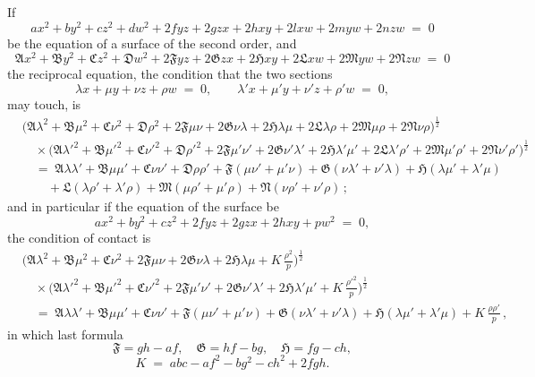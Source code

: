 \documentclass[11pt]{article}
\begin{document}
If
\[
a x^{2} + b y^{2} + c z^{2} + d w^{2} + 2 f y z + 2 g z x + 2 h x y + 2 l x w + 2 m y w + 2 n z w \;=\; 0
\]
be the equation of a surface of the second order, and
\[
\mathfrak{A} x^{2} + \mathfrak{B} y^{2} + \mathfrak{C} z^{2} + \mathfrak{D} w^{2} + 2\mathfrak{F} y z + 2\mathfrak{G} z x + 2\mathfrak{H} x y + 2\mathfrak{L} x w + 2\mathfrak{M} y w + 2\mathfrak{N} z w \;=\; 0
\]
the reciprocal equation, the condition that the two sections
\[
\lambda x + \mu y + \nu z + \rho w \;=\; 0,\qquad \lambda' x + \mu' y + \nu' z + \rho' w \;=\; 0,
\]
may touch, is
\begin{align*}
&\bigl(\mathfrak{A}\lambda^{2} + \mathfrak{B}\mu^{2} + \mathfrak{C}\nu^{2} + \mathfrak{D}\rho^{2} + 2\mathfrak{F}\mu\nu + 2\mathfrak{G}\nu\lambda + 2\mathfrak{H}\lambda\mu + 2\mathfrak{L}\lambda\rho + 2\mathfrak{M}\mu\rho + 2\mathfrak{N}\nu\rho\bigr)^{\frac{1}{2}}\\
&\quad\times\bigl(\mathfrak{A}\lambda'^{2} + \mathfrak{B}\mu'^{2} + \mathfrak{C}\nu'^{2} + \mathfrak{D}\rho'^{2} + 2\mathfrak{F}\mu'\nu' + 2\mathfrak{G}\nu'\lambda' + 2\mathfrak{H}\lambda'\mu' + 2\mathfrak{L}\lambda'\rho' + 2\mathfrak{M}\mu'\rho' + 2\mathfrak{N}\nu'\rho'\bigr)^{\frac{1}{2}}\\
&\quad=\; \mathfrak{A}\lambda\lambda' + \mathfrak{B}\mu\mu' + \mathfrak{C}\nu\nu' + \mathfrak{D}\rho\rho'
   + \mathfrak{F}(\mu\nu' + \mu'\nu) + \mathfrak{G}(\nu\lambda' + \nu'\lambda) + \mathfrak{H}(\lambda\mu' + \lambda'\mu)\\
&\qquad + \mathfrak{L}(\lambda\rho' + \lambda'\rho) + \mathfrak{M}(\mu\rho' + \mu'\rho) + \mathfrak{N}(\nu\rho' + \nu'\rho)\,;
\end{align*}
and in particular if the equation of the surface be
\[
a x^{2} + b y^{2} + c z^{2} + 2 f y z + 2 g z x + 2 h x y + p w^{2} \;=\; 0,
\]
the condition of contact is
\begin{align*}
&\bigl(\mathfrak{A}\lambda^{2} + \mathfrak{B}\mu^{2} + \mathfrak{C}\nu^{2} + 2\mathfrak{F}\mu\nu + 2\mathfrak{G}\nu\lambda + 2\mathfrak{H}\lambda\mu + K\,\tfrac{\rho^{2}}{p}\bigr)^{\frac{1}{2}}\\
&\quad\times\bigl(\mathfrak{A}\lambda'^{2} + \mathfrak{B}\mu'^{2} + \mathfrak{C}\nu'^{2} + 2\mathfrak{F}\mu'\nu' + 2\mathfrak{G}\nu'\lambda' + 2\mathfrak{H}\lambda'\mu' + K\,\tfrac{\rho'^{2}}{p}\bigr)^{\frac{1}{2}}\\
&\quad=\; \mathfrak{A}\lambda\lambda' + \mathfrak{B}\mu\mu' + \mathfrak{C}\nu\nu'
        + \mathfrak{F}(\mu\nu' + \mu'\nu) + \mathfrak{G}(\nu\lambda' + \nu'\lambda) + \mathfrak{H}(\lambda\mu' + \lambda'\mu) + K\,\tfrac{\rho\rho'}{p}\,,
\end{align*}
in which last formula
\[
\mathfrak{F} = g h - a f,\quad \mathfrak{G} = h f - b g,\quad \mathfrak{H} = f g - c h,
\]
\[
K \;=\; abc - a f^{2} - b g^{2} - c h^{2} + 2 f g h.
\]
\end{document}
